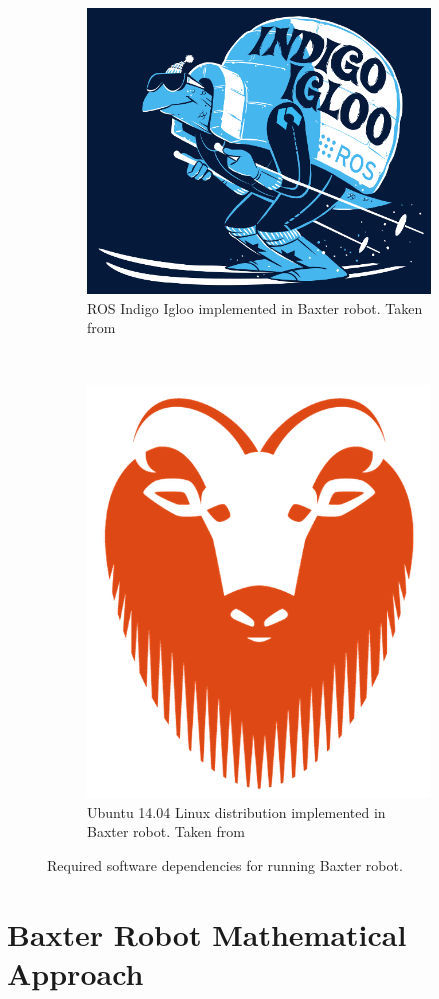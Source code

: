 \documentclass[11pt]{report} %
\begin{document}
\begin{figure}[H]
	\centering
	\begin{subfigure}{.5\textwidth}
		\centering
		\includegraphics[width=0.7\linewidth]{assets/imgs/baxter_robot/ros_indigo.png}
		\caption{ROS Indigo Igloo implemented in Baxter robot. Taken from \citep{cite_ros_indigo_main_page}}
		\label{fig_ros_indigo_logo}
	\end{subfigure}~
	\begin{subfigure}{.5\textwidth}
		\centering
		\includegraphics[width=0.55\linewidth]{assets/imgs/baxter_robot/ubuntu_logo.jpg}
		\caption{Ubuntu 14.04 Linux distribution implemented in Baxter robot. Taken from \citep{cite_ubuntu_download_1404}}
		\label{fig_ubuntu_1404_logo}
	\end{subfigure}%
	\caption{Required software dependencies for running Baxter robot.}
	\label{fig_required_baxter_software}
\end{figure}


\section{Baxter Robot Mathematical Approach}
\end{document}
